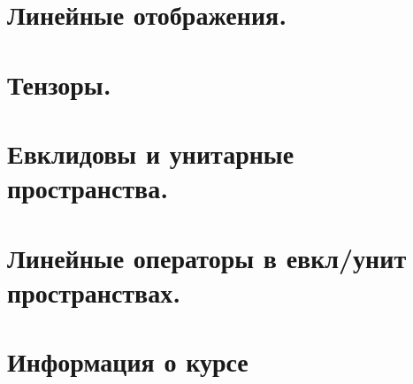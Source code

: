 \maketitle
\tableofcontents
\newpage
\section{Линейные отображения.}

\newpage
\section{Тензоры.}

\newpage
\section{Евклидовы и унитарные пространства.}

\newpage
\section{Линейные операторы в евкл/унит пространствах.}

\newpage
\section{Информация о курсе}


